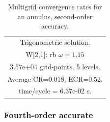 \begin{table}[hbt]
\begin{center}
{\begin{tabular}{|c|c|c|c|c|}
\multicolumn{5}{|c|}{Trigonometric solution.}  \\
\multicolumn{5}{|c|}{W[2,1]: rb $\omega=1.15$}  \\
\multicolumn{5}{|c|}{3.57e+04 grid-points. 5 levels.}  \\
\multicolumn{5}{|c|}{Average CR=$0.018$, ECR=$0.52$.}  \\
\multicolumn{5}{|c|}{time/cycle = 6.37e-02 s.}  \\
\hline 
\end{tabular}
} %
\end{center}
\caption{Multigrid convergence rates for an annulus, second-order accuracy.}
 \label{tab:annulus} 
\end{table}


\clearpage
\subsubsection{Fourth-order accurate}

